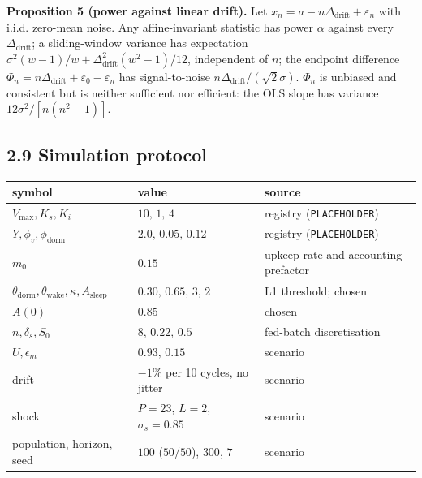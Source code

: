 \documentclass[11pt,a4paper]{article}
\newcounter{none}
\begin{document}
\textbf{Proposition 5 (power against linear drift).} Let
\(x_n=a-n\Delta_{\mathrm{drift}}+\varepsilon_n\) with i.i.d. zero-mean noise. Any
affine-invariant statistic has power \(\alpha\) against every
\(\Delta_{\mathrm{drift}}\); a sliding-window variance has expectation
\(\sigma^2(w-1)/w+\Delta_{\mathrm{drift}}^2(w^2-1)/12\), independent of \(n\); the
endpoint difference
\(\Phi_n=n\Delta_{\mathrm{drift}}+\varepsilon_0-\varepsilon_n\) has signal-to-noise
\(n\Delta_{\mathrm{drift}}/(\sqrt2\sigma)\). \(\Phi_n\) is unbiased and consistent but
is neither sufficient nor efficient: the OLS slope has variance
\(12\sigma^2/[n(n^2-1)]\).

\subsection{2.9 Simulation protocol}\label{simulation-protocol}

{\def\LTcaptype{none} %
\begin{longtable}[]{@{}
  >{\raggedright\arraybackslash}p{}
  >{\raggedleft\arraybackslash}p{}
  >{\raggedright\arraybackslash}p{}@{}}
\toprule\noalign{}
\begin{minipage}[b]{\linewidth}\raggedright
symbol
\end{minipage} & \begin{minipage}[b]{\linewidth}\raggedleft
value
\end{minipage} & \begin{minipage}[b]{\linewidth}\raggedright
source
\end{minipage} \\
\midrule\noalign{}
\endhead
\bottomrule\noalign{}
\endlastfoot
\(V_{\max},K_s,K_i\) & \(10,\,1,\,4\) & registry (\texttt{PLACEHOLDER}) \\
\(Y,\phi_v,\phi_{\mathrm{dorm}}\) & \(2.0,\,0.05,\,0.12\) & registry (\texttt{PLACEHOLDER}) \\
\(m_0\) & \(0.15\) & upkeep rate and accounting prefactor \\
\(\theta_{\mathrm{dorm}},\theta_{\mathrm{wake}},\kappa,A_{\mathrm{sleep}}\) & \(0.30,\,0.65,\,3,\,2\) & L1 threshold; chosen \\
\(A(0)\) & \(0.85\) & chosen \\
\(n,\delta_s,S_0\) & \(8,\,0.22,\,0.5\) & fed-batch discretisation \\
\(U,\epsilon_m\) & \(0.93,\,0.15\) & scenario \\
drift & \(-1\%\) per 10 cycles, no jitter & scenario \\
shock & \(P=23\), \(L=2\), \(\sigma_s=0.85\) & scenario \\
population, horizon, seed & \(100\) (\(50\)/\(50\)), \(300\), \(7\) & scenario \\
\end{longtable}
}
\end{document}
